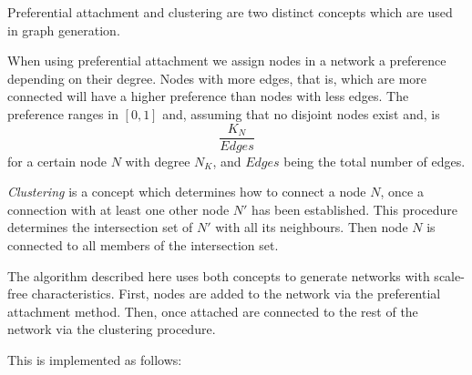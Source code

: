 \documentclass[a4paper,11pt,titlepage]{article}
\begin{document}
Preferential attachment and clustering are two distinct concepts which are used
in graph generation.

When using preferential attachment we assign nodes in a network a preference
depending on their degree. Nodes with more edges, that is, which are more
connected will have a higher preference than nodes with less edges. The
preference ranges in $[0,1]$ and, assuming that no disjoint nodes exist and, is
\[ \frac{K_N}{Edges} \]
for a certain node $N$ with degree $N_K$, and $Edges$ being the total number of
edges.

\emph{Clustering} is a concept which determines how to connect a node $N$, once
a connection with at least one other node $N'$ has been established. This
procedure determines the intersection set of $N'$ with all its neighbours. Then
node $N$ is connected to all members of the intersection set.

The algorithm described here uses both concepts to generate networks with
scale-free characteristics. First, nodes are added to the network via the
preferential attachment method. Then, once attached are connected to the rest of
the network via the clustering procedure. %

This is implemented as follows:
\end{document}
